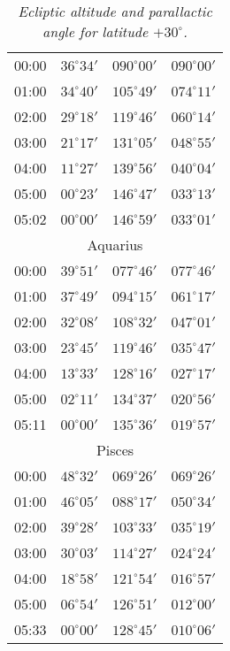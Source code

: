 \begin{table}
\begin{Parallel}{}{}
{{\begin{tabular}{l|lll}
00:00 & $36^\circ 34'$ & $090^\circ 00'$& $090^\circ 00'$ \\
01:00 & $34^\circ 40'$ & $105^\circ 49'$& $074^\circ 11'$ \\
02:00 & $29^\circ 18'$ & $119^\circ 46'$& $060^\circ 14'$ \\
03:00 & $21^\circ 17'$ & $131^\circ 05'$& $048^\circ 55'$ \\
04:00 & $11^\circ 27'$ & $139^\circ 56'$& $040^\circ 04'$ \\
05:00 & $00^\circ 23'$ & $146^\circ 47'$& $033^\circ 13'$ \\
05:02 & $00^\circ 00'$ & $146^\circ 59'$& $033^\circ 01'$ \\
\multicolumn{4}{c}{Aquarius}\\
00:00 & $39^\circ 51'$ & $077^\circ 46'$& $077^\circ 46'$ \\
01:00 & $37^\circ 49'$ & $094^\circ 15'$& $061^\circ 17'$ \\
02:00 & $32^\circ 08'$ & $108^\circ 32'$& $047^\circ 01'$ \\
03:00 & $23^\circ 45'$ & $119^\circ 46'$& $035^\circ 47'$ \\
04:00 & $13^\circ 33'$ & $128^\circ 16'$& $027^\circ 17'$ \\
05:00 & $02^\circ 11'$ & $134^\circ 37'$& $020^\circ 56'$ \\
05:11 & $00^\circ 00'$ & $135^\circ 36'$& $019^\circ 57'$ \\
\multicolumn{4}{c}{Pisces}\\
00:00 & $48^\circ 32'$ & $069^\circ 26'$& $069^\circ 26'$ \\
01:00 & $46^\circ 05'$ & $088^\circ 17'$& $050^\circ 34'$ \\
02:00 & $39^\circ 28'$ & $103^\circ 33'$& $035^\circ 19'$ \\
03:00 & $30^\circ 03'$ & $114^\circ 27'$& $024^\circ 24'$ \\
04:00 & $18^\circ 58'$ & $121^\circ 54'$& $016^\circ 57'$ \\
05:00 & $06^\circ 54'$ & $126^\circ 51'$& $012^\circ 00'$ \\
05:33 & $00^\circ 00'$ & $128^\circ 45'$& $010^\circ 06'$ \\
\end{tabular}
}}
\end{Parallel}
\caption{\em Ecliptic altitude and parallactic angle for latitude $+30^\circ$.}
\end{table}

